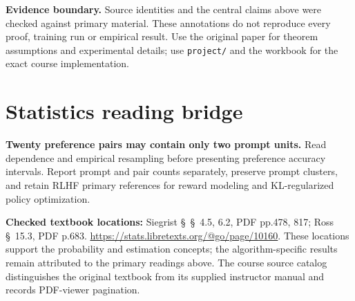 \documentclass[11pt]{scrartcl}
\begin{document}
\noindent\textbf{Evidence boundary.} Source identities and the central claims above were checked against primary material. These annotations do not reproduce every proof, training run or empirical result. Use the original paper for theorem assumptions and experimental details; use \texttt{project/} and the workbook for the exact course implementation.
\section*{Statistics reading bridge}
\textbf{Twenty preference pairs may contain only two prompt units.} Read dependence and empirical resampling before presenting preference accuracy intervals. Report prompt and pair counts separately, preserve prompt clusters, and retain RLHF primary references for reward modeling and KL-regularized policy optimization.

\textbf{Checked textbook locations:} Siegrist \S~\S~4.5, 6.2, PDF pp.478, 817; Ross \S~15.3, PDF p.683. \url{https://stats.libretexts.org/@go/page/10160}. These locations support the probability and estimation concepts; the algorithm-specific results remain attributed to the primary readings above. The course source catalog distinguishes the original textbook from its supplied instructor manual and records PDF-viewer pagination.
\end{document}
